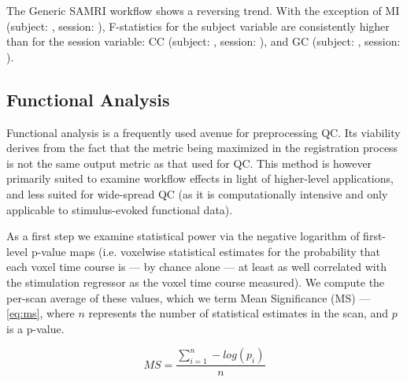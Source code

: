 The Generic SAMRI workflow shows a reversing trend.
With the exception
of MI (subject: , session: ),
F-statistics for the subject variable are consistently higher than for the session variable:
CC (subject: , session: ),
and GC (subject: , session: ).


\subsection{Functional Analysis}

Functional analysis is a frequently used avenue for preprocessing QC.
Its viability derives from the fact that the metric being maximized in the registration process is not the same output metric as that used for QC.
This method is however primarily suited to examine workflow effects in light of higher-level applications, and less suited for wide-spread QC (as it is computationally intensive and only applicable to stimulus-evoked functional data).

As a first step we examine statistical power via the negative logarithm of first-level p-value maps (i.e. voxelwise statistical estimates for the probability that each voxel time course is --- by chance alone --- at least as well correlated with the stimulation regressor as the voxel time course measured).
We compute the per-scan average of these values, which we term Mean Significance (MS) --- \cref{eq:ms}, where $n$ represents the number of statistical estimates in the scan, and $p$ is a p-value.

\begin{equation} \label{eq:ms}
        M\!S = \frac{\sum_{i=1}^n -log(p_i)}{n}
\end{equation}

